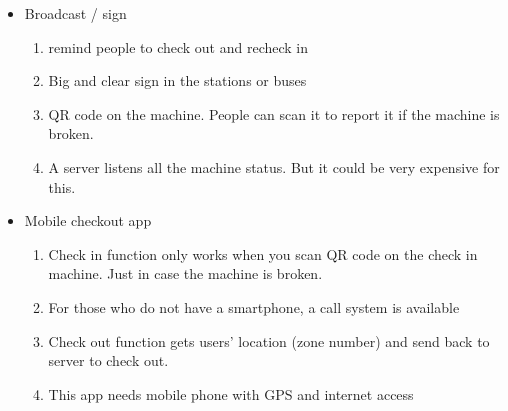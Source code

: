 \begin{enumerate}
\begin{itemize}
			\item Broadcast / sign
				\begin{enumerate}
					\item remind people to check out and recheck in
					\item Big and clear sign in the stations or buses
					\item QR code on the machine. People can scan it to report it if the machine is broken.
					\item A server listens all the machine status. But it could be very expensive for this.  
				\end{enumerate}
			
			\item Mobile checkout app
				\begin{enumerate}
					\item Check in function only works when you scan QR code on the check in machine. Just in case the machine is broken.
					\item For those who do not have a smartphone, a call system is available
					\item Check out function gets users’ location (zone number) and send back to server to check out.
					\item This app needs mobile phone with GPS and internet access
				\end{enumerate}
			
		\end{itemize}

\end{enumerate}